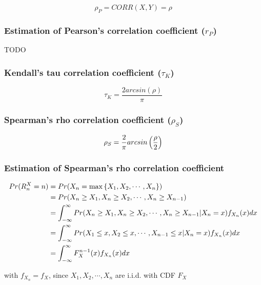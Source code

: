 \[
    \rho_P
    = CORR(X,Y)
    = \rho
\]

\subsubsection{Estimation of Pearson’s correlation coefficient ($r_P$) \cite{ism-1}} \label{Normal distribution: Bivariate/ Multivariate: Estimation of Pearson’s correlation coefficient}

TODO

\subsubsection{Kendall’s tau correlation coefficient ($\tau_K$) \cite{ism-1}} \label{Normal distribution: Bivariate/ Multivariate: Kendall’s tau correlation coefficient}

\[
    \tau_K = \dfrac{2 arcsin(\rho)}{\pi}
\]

\subsubsection{Spearman’s rho correlation coefficient ($\rho_S$) \cite{ism-1}} \label{Normal distribution: Bivariate/ Multivariate: Spearman’s rho correlation coefficient}

\[
    \rho_S = \dfrac{2}{\pi} arcsin\left(\dfrac{\rho}{2}\right)
\]

\subsubsection{Estimation of Spearman’s rho correlation coefficient \cite{ism-1}} \label{Normal distribution: Bivariate/ Multivariate: Estimation of Spearman’s rho correlation coefficient}

\begin{align*}
    Pr(R^X_n = n) 
    &= Pr(X_n = \max\left\{X_1, X_2,\cdots , X_n\right\}) \\
    &= Pr(X_n \geq X_1, X_n \geq X_2,\cdots , X_n \geq X_{n-1}) \\
    &= \displaystyle\int_{-\infty}^{\infty}
        Pr(X_n \geq X_1, X_n \geq X_2,\cdots, X_n \geq X_{n-1}|X_n = x) f_{X_n}(x)dx \\
    &= \displaystyle\int_{-\infty}^{\infty}
        Pr(X_1 \leq x, X_2 \leq x,\cdots, X_{n-1} \leq x|X_n = x) f_{X_n}(x)dx \\
    &= \displaystyle\int_{-\infty}^{\infty} F^{n-1}_X (x) f_{X_n}(x)dx
\end{align*}

with $f_{X_n} = f_X$, since $X_1, X_2,\cdots, X_n$ are i.i.d. with CDF $F_X$

